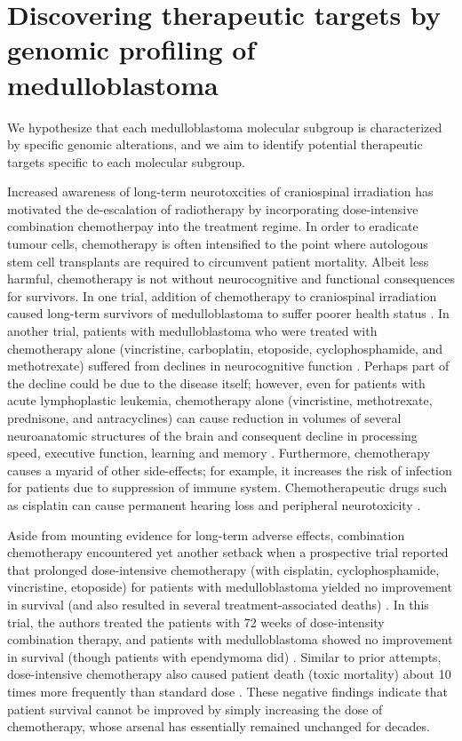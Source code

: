 \chapter{Discovering therapeutic targets by genomic profiling of medulloblastoma}
\label{ch:target-id}

\begin{objective}
We hypothesize that each medulloblastoma molecular subgroup is characterized by specific genomic alterations, and we aim to identify potential therapeutic targets specific to each molecular subgroup.
\end{objective}

Increased awareness of long-term neurotoxcities of craniospinal irradiation has motivated the de-escalation of radiotherapy by incorporating dose-intensive combination chemotherpay into the treatment regime. In order to eradicate tumour cells, chemotherapy is often intensified to the point where autologous stem cell transplants are required to circumvent patient mortality. Albeit less harmful, chemotherapy is not without neurocognitive and functional consequences for survivors. In one trial, addition of chemotherapy to craniospinal irradiation caused long-term survivors of medulloblastoma to suffer poorer health status . In another trial, patients with medulloblastoma who were treated with chemotherapy alone (vincristine, carboplatin, etoposide, cyclophosphamide, and methotrexate) suffered from declines in neurocognitive function . Perhaps part of the decline could be due to the disease itself; however, even for patients with acute lymphoplastic leukemia, chemotherapy alone (vincristine, methotrexate, prednisone, and antracyclines) can cause reduction in volumes of several neuroanatomic structures of the brain and consequent decline in processing speed, executive function, learning and memory . Furthermore, chemotherapy causes a myarid of other side-effects; for example, it increases the risk of infection for patients due to suppression of immune system. Chemotherapeutic drugs such as cisplatin can cause permanent hearing loss and peripheral neurotoxicity .

Aside from mounting evidence for long-term adverse effects, combination chemotherapy encountered yet another setback when a prospective trial reported that prolonged dose-intensive chemotherapy (with cisplatin, cyclophosphamide, vincristine, etoposide) for patients with medulloblastoma yielded no improvement in survival (and also resulted in several treatment-associated deaths) . In this trial, the authors treated the patients with 72 weeks of dose-intensity combination therapy, and patients with medulloblastoma showed no improvement in survival (though patients with ependymoma did) . Similar to prior attempts, dose-intensive chemotherapy also caused patient death (toxic mortality) about 10 times more frequently than standard dose  . These negative findings indicate that patient survival cannot be improved by simply increasing the dose of chemotherapy, whose arsenal has essentially remained unchanged for decades.

